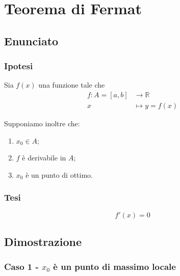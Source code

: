 \documentclass[../dimostrazioni]{subfiles}
\begin{document}
    \chapter{Teorema di Fermat}

        \section*{Enunciato}

        \subsection*{Ipotesi}

            Sia \(f(x)\) una funzione tale che
            \begin{align*}
                f : A = [a, b] &\longrightarrow \mathbb{R}\\
                x &\longmapsto y = f(x) 
            \end{align*}

            Supponiamo inoltre che:

            \begin{enumerate}
                \indentitem \item \(x_0 \in A\);
                \indentitem \item \(f\) è derivabile in \(A\);
                \indentitem \item \(x_0\) è un punto di ottimo.
            \end{enumerate}

        \subsection*{Tesi}

            \[f'(x) = 0\]

        \section*{Dimostrazione}

            \medskip

            \subsection{Caso 1 - \(x_0\) è un punto di massimo locale}

            
    

    
\end{document}
